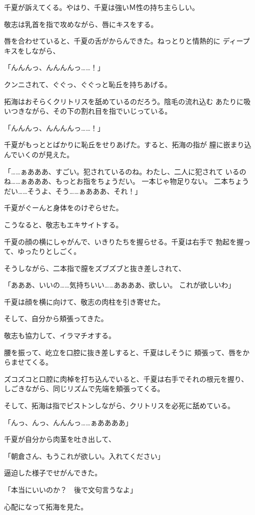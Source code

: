 ﻿\documentclass[
    book,tate,
    line_length=30zw,
    jafontsize=12pt,
    paper=b5j,
    landscape,
    ]{jlreq}
\begin{document}
千夏が訴えてくる。やはり、千夏は強いＭ性の持ち主らしい。

敬志は乳首を指で攻めながら、唇にキスをする。

唇を合わせていると、千夏の舌がからんできた。ねっとりと情熱的に
ディープキスをしながら、

「んんんっ、んんんんっ……！」

クンニされて、ぐぐっ、ぐぐっと恥丘を持ちあげる。

拓海はおそらくクリトリスを舐めているのだろう。陰毛の流れ込む
あたりに吸いつきながら、その下の割れ目を指でいじっている。

「んんんっ、んんんんっ……！」

千夏がもっととばかりに恥丘をせりあげた。すると、拓海の指が
膣に嵌まり込んでいくのが見えた。

「……ぁあああ、すごい。犯されているのね。わたし、二人に犯されて
いるのね……ぁあああ、もっとお指をちょうだい。 一本じゃ物足りない。
二本ちょうだい……そうよ、そう……ぁあああ、それ！」

千夏がぐーんと身体をのけぞらせた。

こうなると、敬志もエキサイトする。

千夏の顔の横にしゃがんで、いきりたちを握らせる。千夏は右手で
勃起を握って、ゆったりとしごく。

そうしながら、二本指で膣をズブズブと抜き差しされて、

「あああ、いいの……気持ちいい……ああああ、欲しい。 これが欲しいわ」

千夏は顔を横に向けて、敬志の肉柱を引き寄せた。

そして、自分から頬張ってきた。

敬志も協力して、イラマチオする。

腰を振って、屹立を口腔に抜き差しすると、千夏はしそうに
頬張って、唇をからませてくる。

ズコズコと口腔に肉棹を打ち込んでいると、千夏は右手でそれの根元を握り、
しごきながら、同じリズムで先端を頬張ってくる。

そして、拓海は指でピストンしながら、クリトリスを必死に舐めている。

「んっ、んっ、んんんっ……ぁああああ」

千夏が自分から肉茎を吐き出して、

「朝倉さん、もうこれが欲しい。入れてください」

逼迫した様子でせがんできた。

「本当にいいのか？　後で文句言うなよ」

心配になって拓海を見た。
\end{document}
